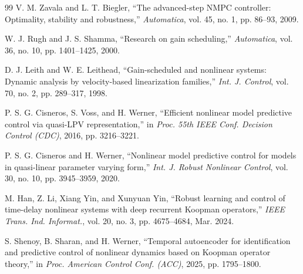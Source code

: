 ﻿\documentclass[journal]{IEEEtran}
\begin{document}
\begin{thebibliography}{99}
V. M. Zavala and L. T. Biegler, ``The advanced-step NMPC controller: Optimality, stability and robustness,'' \emph{Automatica}, vol. 45, no. 1, pp. 86--93, 2009.

W. J. Rugh and J. S. Shamma, ``Research on gain scheduling,'' \emph{Automatica}, vol. 36, no. 10, pp. 1401--1425, 2000.

D. J. Leith and W. E. Leithead, ``Gain-scheduled and nonlinear systems: Dynamic analysis by velocity-based linearization families,'' \emph{Int. J. Control}, vol. 70, no. 2, pp. 289--317, 1998.

P. S. G. Cisneros, S. Voss, and H. Werner, ``Efficient nonlinear model predictive control via quasi-LPV representation,'' in \emph{Proc. 55th IEEE Conf. Decision Control (CDC)}, 2016, pp. 3216--3221.

P. S. G. Cisneros and H. Werner, ``Nonlinear model predictive control for models in quasi-linear parameter varying form,'' \emph{Int. J. Robust Nonlinear Control}, vol. 30, no. 10, pp. 3945--3959, 2020.

M. Han, Z. Li, Xiang Yin, and Xunyuan Yin, ``Robust learning and control of time-delay nonlinear systems with deep recurrent Koopman operators,'' \emph{IEEE Trans. Ind. Informat.}, vol. 20, no. 3, pp. 4675--4684, Mar. 2024.

S. Shenoy, B. Sharan, and H. Werner, ``Temporal autoencoder for identification and predictive control of nonlinear dynamics based on Koopman operator theory,'' in \emph{Proc. American Control Conf. (ACC)}, 2025, pp. 1795--1800.

\end{thebibliography}
\end{document}
